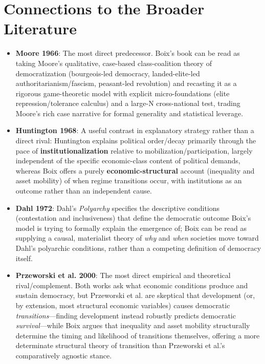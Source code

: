 \documentclass[12pt]{article}
\begin{document}
\section{Connections to the Broader Literature}

\begin{itemize}[leftmargin=*, itemsep=4pt]
    \item \textbf{Moore 1966}: The most direct predecessor. Boix's book can be read as taking Moore's qualitative, case-based class-coalition theory of democratization (bourgeois-led democracy, landed-elite-led authoritarianism/fascism, peasant-led revolution) and recasting it as a rigorous game-theoretic model with explicit micro-foundations (elite repression/tolerance calculus) and a large-N cross-national test, trading Moore's rich case narrative for formal generality and statistical leverage.
    \item \textbf{Huntington 1968}: A useful contrast in explanatory strategy rather than a direct rival: Huntington explains political order/decay primarily through the pace of \textbf{institutionalization} relative to mobilization/participation, largely independent of the specific economic-class content of political demands, whereas Boix offers a purely \textbf{economic-structural} account (inequality and asset mobility) of when regime transitions occur, with institutions as an outcome rather than an independent cause.
    \item \textbf{Dahl 1972}: Dahl's \textit{Polyarchy} specifies the descriptive conditions (contestation and inclusiveness) that define the democratic outcome Boix's model is trying to formally explain the emergence of; Boix can be read as supplying a causal, materialist theory of \emph{why} and \emph{when} societies move toward Dahl's polyarchic conditions, rather than a competing definition of democracy itself.
    \item \textbf{Przeworski et al. 2000}: The most direct empirical and theoretical rival/complement. Both works ask what economic conditions produce and sustain democracy, but Przeworski et al. are skeptical that development (or, by extension, most structural economic variables) causes democratic \emph{transitions}---finding development instead robustly predicts democratic \emph{survival}---while Boix argues that inequality and asset mobility structurally determine the timing and likelihood of transitions themselves, offering a more determinate structural theory of transition than Przeworski et al.'s comparatively agnostic stance.

\end{itemize}
\end{document}
